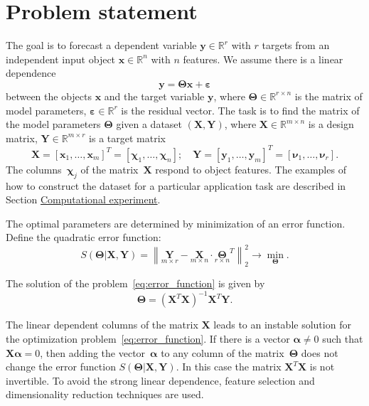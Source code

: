 \documentclass[12pt,twoside]{article}
\newcommand{\bx}{\mathbf{x}}
\newcommand{\by}{\mathbf{y}}
\newcommand{\bY}{\mathbf{Y}}
\newcommand{\bX}{\mathbf{X}}
\newcommand{\bbR}{\mathbb{R}}
\newcommand{\bchi}{\boldsymbol{\chi}}
\newcommand{\bnu}{\boldsymbol{\nu}}
\newcommand{\bTheta}{\boldsymbol{\Theta}}
\begin{document}
\linenumbers
\section{Problem statement}

The goal is to forecast a dependent variable $\by \in \bbR^r$ with $r$ targets from an independent input object $\bx \in \bbR^n$ with $n$ features.
We assume there is a linear dependence 
\begin{equation}
	\by = \bTheta \bx+ \boldsymbol{\varepsilon}
	\label{eq:model}
\end{equation}
between the objects $\bx$ and the target variable $\by$,
where $\bTheta \in \bbR^{r \times n}$ is the matrix of model parameters, $\boldsymbol{\varepsilon} \in \bbR^{r}$ is the residual vector.
The task is to find the matrix of the model parameters $\bTheta$ given a dataset $\left( \bX, \bY \right)$, where $\bX \in \bbR^{m \times n}$ is a design matrix, $\bY \in \bbR^{m \times r}$ is a target matrix
\[
	\bX = [\bx_1, \dots, \bx_m]^T =  [\bchi_1, \dots, \bchi_n]; \quad \bY = [\by_1, \dots, \by_m]^T =  [\bnu_1, \dots, \bnu_r].
\]
The columns~$\bchi_j$ of the matrix~$\bX$ respond to object features. 
The examples of how to construct the dataset for a particular application task are described in Section \hyperref[sec:exper]{Computational experiment}.

The optimal parameters are determined by minimization of an error function. 
Define the quadratic error function:
\begin{equation}
	S(\bTheta | \bX, \bY) = {\left\| \underset{m \times r}{\mathbf{Y}}  - \underset{m \times n}{\bX} \cdot \underset{r \times n}{\bTheta}^T \right\| }_2^2 \rightarrow\min_{\bTheta}.
\label{eq:error_function}
\end{equation}
 
 The solution of the problem~\eqref{eq:error_function} is given by
 \[
 	\bTheta = (\bX^T \bX)^{-1} \bX^T \bY.
 \]
 
 The linear dependent columns of the matrix $\bX$ leads to an instable solution for the optimization problem~\eqref{eq:error_function}. 
 If there is a vector $\boldsymbol{\alpha} \neq 0$ such that $\bX \boldsymbol{\alpha}= 0$, then adding the vector~$\boldsymbol{\alpha}$ to any column of the matrix~$\bTheta$ does not change the error function $S(\bTheta | \bX, \bY)$.
 In this case the matrix $\bX^T \bX$ is not invertible.
 To avoid the strong linear dependence, feature selection and dimensionality reduction techniques are used.
 
\end{document}
